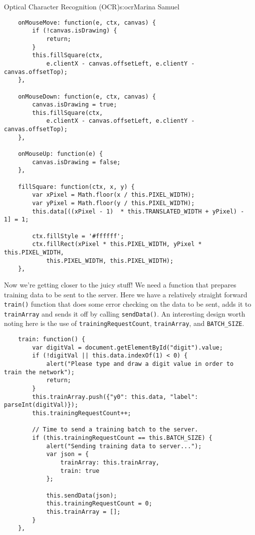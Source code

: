 \begin{aosachapter}{Optical Character Recognition (OCR)}{s:ocr}{Marina Samuel}
\begin{verbatim}
    onMouseMove: function(e, ctx, canvas) {
        if (!canvas.isDrawing) {
            return;
        }
        this.fillSquare(ctx, 
            e.clientX - canvas.offsetLeft, e.clientY - canvas.offsetTop);
    },

    onMouseDown: function(e, ctx, canvas) {
        canvas.isDrawing = true;
        this.fillSquare(ctx, 
            e.clientX - canvas.offsetLeft, e.clientY - canvas.offsetTop);
    },

    onMouseUp: function(e) {
        canvas.isDrawing = false;
    },

    fillSquare: function(ctx, x, y) {
        var xPixel = Math.floor(x / this.PIXEL_WIDTH);
        var yPixel = Math.floor(y / this.PIXEL_WIDTH);
        this.data[((xPixel - 1)  * this.TRANSLATED_WIDTH + yPixel) - 1] = 1;

        ctx.fillStyle = '#ffffff';
        ctx.fillRect(xPixel * this.PIXEL_WIDTH, yPixel * this.PIXEL_WIDTH, 
            this.PIXEL_WIDTH, this.PIXEL_WIDTH);
    },
\end{verbatim}

Now we're getting closer to the juicy stuff! We need a function that
prepares training data to be sent to the server. Here we have a
relatively straight forward \texttt{train()} function that does some
error checking on the data to be sent, adds it to \texttt{trainArray}
and sends it off by calling \texttt{sendData()}. An interesting design
worth noting here is the use of \texttt{trainingRequestCount},
\texttt{trainArray}, and \texttt{BATCH\_SIZE}.

\begin{verbatim}
    train: function() {
        var digitVal = document.getElementById("digit").value;
        if (!digitVal || this.data.indexOf(1) < 0) {
            alert("Please type and draw a digit value in order to train the network");
            return;
        }
        this.trainArray.push({"y0": this.data, "label": parseInt(digitVal)});
        this.trainingRequestCount++;

        // Time to send a training batch to the server.
        if (this.trainingRequestCount == this.BATCH_SIZE) {
            alert("Sending training data to server...");
            var json = {
                trainArray: this.trainArray,
                train: true
            };

            this.sendData(json);
            this.trainingRequestCount = 0;
            this.trainArray = [];
        }
    },
\end{verbatim}


\end{aosachapter}

